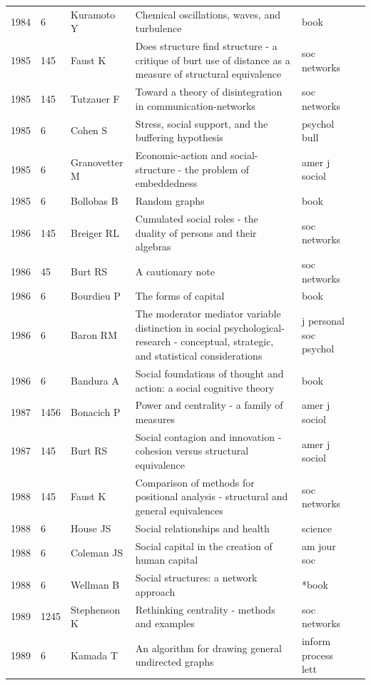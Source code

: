 \documentclass[11pt]{article} %
\begin{document}
\begin{landscape}
\begin{longtable}{p{0.7cm}|p{0.8cm}|p{3cm}|p{14.5cm}|p{3.5cm}l}
1984& 	6& 	 Kuramoto Y & 	 Chemical oscillations, waves, and turbulence& 	 book\\
1985& 	145& 	 Faust K& 	 Does structure find structure - a critique of burt use of distance as a measure of structural equivalence& 	 soc networks\\
1985& 	145& 	 Tutzauer F& 	 Toward a theory of disintegration in communication-networks& 	 soc networks\\
1985& 	6& 	 Cohen S& 	 Stress, social support, and the buffering hypothesis& 	 psychol bull\\
1985& 	6& 	 Granovetter M& 	 Economic-action and social-structure - the problem of embeddedness& 	 amer j sociol\\
1985& 	6& 	 Bollobas B& 	 Random graphs& 	 book\\
1986& 	145& 	 Breiger RL& 	 Cumulated social roles - the duality of persons and their algebras& 	 soc networks\\
1986& 	45& 	 Burt RS& 	 A cautionary note& 	 soc networks\\
1986& 	6& 	 Bourdieu P & 	 The forms of capital& 	 book\\
1986& 	6& 	 Baron RM& 	 The moderator mediator variable distinction in social psychological-research - conceptual, strategic, and statistical considerations& 	 j personal soc psychol\\
1986& 	6& 	 Bandura A& 	 Social foundations of thought and action: a social cognitive theory& 	 book\\
1987& 	1456& 	 Bonacich P& 	 Power and centrality - a family of measures& 	 amer j sociol\\
1987& 	145& 	 Burt RS& 	 Social contagion and innovation - cohesion versus structural equivalence& 	 amer j sociol\\
1988& 	145& 	 Faust K& 	 Comparison of methods for positional analysis - structural and general equivalences& 	 soc networks\\
1988& 	6& 	 House JS& 	 Social relationships and health& 	 science\\
1988& 	6& 	 Coleman JS& 	 Social capital in the creation of human capital& 	 am jour soc\\
1988& 	6& 	 Wellman B& 	 Social structures: a network approach& 	 *book\\
1989& 	1245& 	 Stephenson K& 	 Rethinking centrality - methods and examples& 	 soc networks\\
1989& 	6& 	 Kamada T& 	 An algorithm for drawing general undirected graphs& 	 inform process lett\\

\end{longtable}
\end{landscape}
\end{document}
